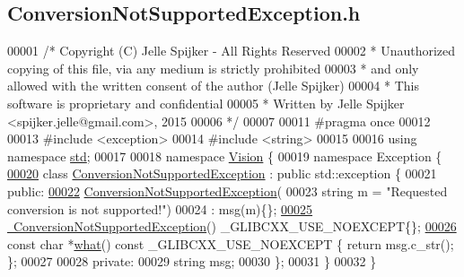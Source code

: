 \hypertarget{_conversion_not_supported_exception_8h_source}{}\subsection{Conversion\+Not\+Supported\+Exception.\+h}
\label{_conversion_not_supported_exception_8h_source}

\begin{DoxyCode}
00001 \textcolor{comment}{/* Copyright (C) Jelle Spijker - All Rights Reserved}
00002 \textcolor{comment}{ * Unauthorized copying of this file, via any medium is strictly prohibited}
00003 \textcolor{comment}{ * and only allowed with the written consent of the author (Jelle Spijker)}
00004 \textcolor{comment}{ * This software is proprietary and confidential}
00005 \textcolor{comment}{ * Written by Jelle Spijker <spijker.jelle@gmail.com>, 2015}
00006 \textcolor{comment}{ */}
00007 
00011 \textcolor{preprocessor}{#pragma once}
00012 
00013 \textcolor{preprocessor}{#include <exception>}
00014 \textcolor{preprocessor}{#include <string>}
00015 
00016 \textcolor{keyword}{using namespace }\hyperlink{namespacestd}{std};
00017 
00018 \textcolor{keyword}{namespace }\hyperlink{namespace_vision}{Vision} \{
00019 \textcolor{keyword}{namespace }Exception \{
\hypertarget{_conversion_not_supported_exception_8h_source_l00020}{}\hyperlink{class_vision_1_1_exception_1_1_conversion_not_supported_exception}{00020} \textcolor{keyword}{class }\hyperlink{class_vision_1_1_exception_1_1_conversion_not_supported_exception}{ConversionNotSupportedException} : \textcolor{keyword}{public} std::exception \{
00021 \textcolor{keyword}{public}:
\hypertarget{_conversion_not_supported_exception_8h_source_l00022}{}\hyperlink{class_vision_1_1_exception_1_1_conversion_not_supported_exception_a34e253638a4c162ae5167caa24b291be}{00022}   \hyperlink{class_vision_1_1_exception_1_1_conversion_not_supported_exception_a34e253638a4c162ae5167caa24b291be}{ConversionNotSupportedException}(
00023       \textcolor{keywordtype}{string} m = \textcolor{stringliteral}{"Requested conversion is not supported!"})
00024       : msg(m)\{\};
\hypertarget{_conversion_not_supported_exception_8h_source_l00025}{}\hyperlink{class_vision_1_1_exception_1_1_conversion_not_supported_exception_a84a70ce59ae2c3c0e5482875b8fe502e}{00025}   \hyperlink{class_vision_1_1_exception_1_1_conversion_not_supported_exception_a84a70ce59ae2c3c0e5482875b8fe502e}{~ConversionNotSupportedException}() \_GLIBCXX\_USE\_NOEXCEPT\{\};
\hypertarget{_conversion_not_supported_exception_8h_source_l00026}{}\hyperlink{class_vision_1_1_exception_1_1_conversion_not_supported_exception_a1a19cac0a67a7db2e187aac55b06e4c2}{00026}   \textcolor{keyword}{const} \textcolor{keywordtype}{char} *\hyperlink{class_vision_1_1_exception_1_1_conversion_not_supported_exception_a1a19cac0a67a7db2e187aac55b06e4c2}{what}() const \_GLIBCXX\_USE\_NOEXCEPT \{ \textcolor{keywordflow}{return} msg.c\_str(); \};
00027 
00028 \textcolor{keyword}{private}:
00029   \textcolor{keywordtype}{string} msg;
00030 \};
00031 \}
00032 \}
\end{DoxyCode}

